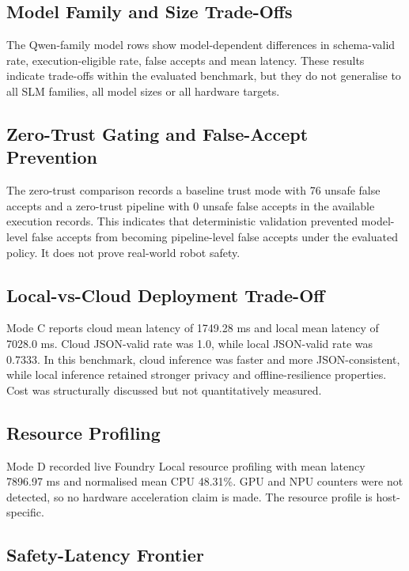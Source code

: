 \subsection{Model Family and Size Trade-Offs}

The Qwen-family model rows show model-dependent differences in schema-valid rate, execution-eligible rate, false accepts and mean latency. These results indicate trade-offs within the evaluated benchmark, but they do not generalise to all SLM families, all model sizes or all hardware targets.

\subsection{Zero-Trust Gating and False-Accept Prevention}

The zero-trust comparison records a baseline trust mode with 76 unsafe false accepts and a zero-trust pipeline with 0 unsafe false accepts in the available execution records. This indicates that deterministic validation prevented model-level false accepts from becoming pipeline-level false accepts under the evaluated policy. It does not prove real-world robot safety.

\subsection{Local-vs-Cloud Deployment Trade-Off}

Mode C reports cloud mean latency of 1749.28 ms and local mean latency of 7028.0 ms. Cloud JSON-valid rate was 1.0, while local JSON-valid rate was 0.7333. In this benchmark, cloud inference was faster and more JSON-consistent, while local inference retained stronger privacy and offline-resilience properties. Cost was structurally discussed but not quantitatively measured.

\subsection{Resource Profiling}

Mode D recorded live Foundry Local resource profiling with mean latency 7896.97 ms and normalised mean CPU 48.31\%. GPU and NPU counters were not detected, so no hardware acceleration claim is made. The resource profile is host-specific.

\subsection{Safety-Latency Frontier}

